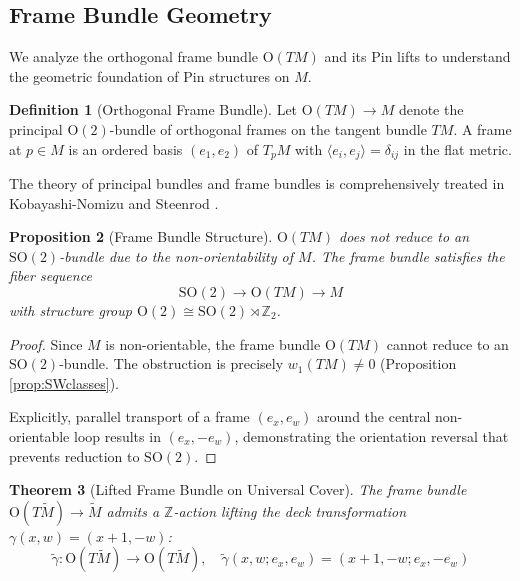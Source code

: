 \documentclass[11pt]{amsart}
\newtheorem{theorem}{Theorem}[section]
\newtheorem{proposition}[theorem]{Proposition}
\theoremstyle{definition}
\newtheorem{definition}[theorem]{Definition}
\theoremstyle{remark}
\newcommand{\ZZ}{\mathbb{Z}}
\newcommand{\wt}{\widetilde}
\begin{document}
\subsection{Frame Bundle Geometry}\label{sec:frame-bundle}

We analyze the orthogonal frame bundle $\mathrm{O}(TM)$ and its Pin lifts to understand the geometric foundation of Pin structures on $M$.

\begin{definition}[Orthogonal Frame Bundle]\label{def:frame-bundle}
Let $\mathrm{O}(TM) \to M$ denote the principal $\mathrm{O}(2)$-bundle of orthogonal frames on the tangent bundle $TM$. A frame at $p \in M$ is an ordered basis $(e_1, e_2)$ of $T_pM$ with $\langle e_i, e_j \rangle = \delta_{ij}$ in the flat metric.
\end{definition}

The theory of principal bundles and frame bundles is comprehensively treated in Kobayashi-Nomizu \cite{Kobayashi1963} and Steenrod \cite{Steenrod1951}.

\begin{proposition}[Frame Bundle Structure]\label{prop:frame-structure}
$\mathrm{O}(TM)$ does not reduce to an $\mathrm{SO}(2)$-bundle due to the non-orientability of $M$. The frame bundle satisfies the fiber sequence
\[
\mathrm{SO}(2) \to \mathrm{O}(TM) \to M
\]
with structure group $\mathrm{O}(2) \cong \mathrm{SO}(2) \rtimes \ZZ_2$.
\end{proposition}

\begin{proof}
Since $M$ is non-orientable, the frame bundle $\mathrm{O}(TM)$ cannot reduce to an $\mathrm{SO}(2)$-bundle. The obstruction is precisely $w_1(TM) \neq 0$ (Proposition \ref{prop:SWclasses}).

Explicitly, parallel transport of a frame $(e_x, e_w)$ around the central non-orientable loop results in $(e_x, -e_w)$, demonstrating the orientation reversal that prevents reduction to $\mathrm{SO}(2)$.
\end{proof}

\begin{theorem}[Lifted Frame Bundle on Universal Cover]\label{thm:lifted-frame}
The frame bundle $\mathrm{O}(T\wt{M}) \to \wt{M}$ admits a $\ZZ$-action lifting the deck transformation $\gamma(x,w) = (x+1,-w)$:
\[
\widetilde{\gamma}: \mathrm{O}(T\wt{M}) \to \mathrm{O}(T\wt{M}), \quad 
\widetilde{\gamma}(x,w; e_x, e_w) = (x+1, -w; e_x, -e_w)
\]
\end{theorem}
\end{document}
